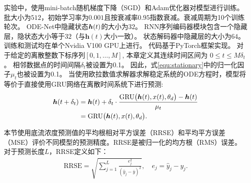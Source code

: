 实验中，使用mini-batch随机梯度下降（SGD）和Adam优化器\cite{kingma2014adam}对模型进行训练。
批大小为$512$，初始学习率为$0.001$且按衰减率$0.95$指数衰减。衰减周期为10个训练轮次。
ODE-Net中隐藏状态$\boldsymbol h(t)$的大小为$32$。
RNN序列编码器模块包含一个隐藏层，隐状态大小等于$32$（与$\boldsymbol h(t)$大小一致）。
状态解码器中隐藏层的大小为$64$。
训练和测试均在单个Nvidia V100 GPU上进行。
代码基于PyTorch框架实现。
对于给定的离散整数下标序列$[0,1,\dots, M]$, 本章定义其连续时间区间为 $0\leq t\leq M\delta_t$。
相邻数据点的时间间隔$\delta _t$被设置为0.1。
因此，式\eqref{equ:stationary}中的归一化因子$\mu _t$也被设置为0.1。
当使用欧拉数值求解器求解稳定系统的ODE方程时，模型将等价于直接使用GRU网络在离散时间系统下进行预测:
\begin{align}
    \boldsymbol h(t+\delta _t) &=\boldsymbol h(t) + \delta _t \cdot \frac{\text{GRU}\big(\boldsymbol h(t),x(t), \theta_d \big) - \boldsymbol h(t)}{\mu _t}  \nonumber\\
                      &= \text{GRU}\big(\boldsymbol h(t),x(t), \theta _d\big).
\end{align}

本节使用底流浓度预测值的平均根相对平方误差（RRSE）和平均平方误差（MSE）评价不同模型的预测精度。RRSE是被归一化的均方根（RMS）误差。对于预测长度$L$，RRSE定义如下：
\begin{equation}
\begin{aligned}
    \text{RRSE}=\sqrt{\sum_{j=1}^{L} \frac{e_{j}^{2}}{\left(\hat{y}_{j}-\bar{y}\right)^{2}}}, \quad e_{j}=\hat{y}_{j}-y_{j}.
\end{aligned}
\label{equ:rrse}
\end{equation}




